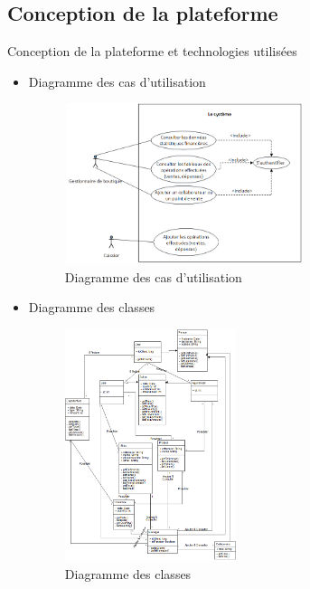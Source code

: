 \documentclass[xcolor=dvipsnames]{beamer}
\begin{document}
  \subsection{Conception de la plateforme}
  \begin{frame}{Conception de la plateforme et technologies utilisées}
  \begin{itemize}
    \item Diagramme des cas d'utilisation
    
      \begin{center}
	\begin{figure}[H]
	\includegraphics[scale=0.4, width=7cm, height=4.7cm]{images/diagramUserCase.png}
	\caption{Diagramme des cas d'utilisation}
	\end{figure} 
      \end{center}		  		
  \end{itemize}
  \end{frame}
    
    
  \begin{frame}
  \begin{itemize}
    \item Diagramme des classes
    
    \begin{center}
      \begin{figure}[H]
	\includegraphics[scale=0.2, width=5cm]{images/diagramClass.png}
	\caption{Diagramme des classes}
      \end{figure} 
    \end{center}
  \end{itemize}
  \end{frame}
  
\end{document}
